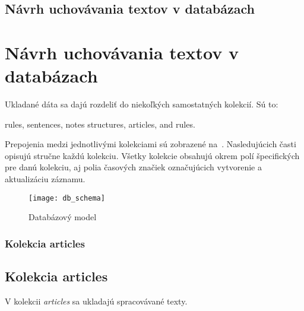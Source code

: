 %
%
{
	\subsection{Návrh uchovávania textov v databázach}
}
{
	\section{Návrh uchovávania textov v databázach}
}
\label{subsection:our_design_persisting_data}
Ukladané dáta sa dajú rozdeliť do niekoľkých samostatných kolekcií. Sú to:

\begin{my_itemize}
	\myitem rules,
	\myitem sentences,
	\myitem notes
	\myitem structures,
	\myitem articles,
	\myitem and rules.
\end{my_itemize}
	
Prepojenia medzi jednotlivými kolekciami sú zobrazené na~. Nasledujúcich časti opisujú stručne každú kolekciu. Všetky kolekcie obsahujú okrem polí špecifických pre danú kolekciu, aj polia časových značiek označujúcich vytvorenie a aktualizáciu záznamu.

\begin{figure}[H]
	\begin{center}\texttt{[image: db\_schema]}\end{center}
	\caption[Databázový model]{Databázový model}\label{fig:db_schema}
\end{figure}

%
%
{
	\subsubsection{Kolekcia articles}
}
{
	\subsection{Kolekcia articles}
}
\label{subsubsection:collection_articles}
V kolekcii \textit{articles} sa ukladajú spracovávané texty. 

